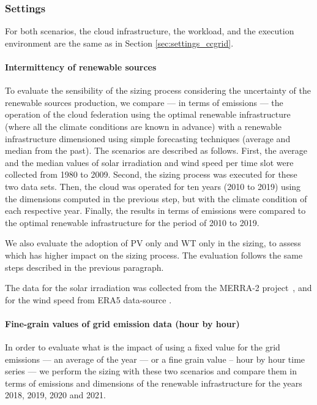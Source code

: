 \subsubsection{Settings}


For both scenarios, the cloud infrastructure, the workload, and the execution environment are the same as in Section  \ref{sec:settings_ccgrid}.

\paragraph{Intermittency of renewable sources}

To evaluate the sensibility of the sizing process considering the uncertainty of the renewable sources production, we compare --- in terms of  emissions ---  the operation of the cloud federation using the optimal renewable infrastructure (where all the climate conditions are known in advance) with a renewable infrastructure dimensioned using simple forecasting techniques (average and median from the past). The scenarios are described as follows. First, the average and the median values of solar irradiation and wind speed per time slot were collected from 1980 to 2009. Second, the sizing process was executed for these two data sets. Then, the cloud was operated for ten years (2010 to 2019) using the dimensions computed in the previous step, but with the climate condition of each respective year. Finally, the results in terms of  emissions were compared to the optimal renewable infrastructure for the period of 2010 to 2019.

We also evaluate the adoption of PV only and WT only in the sizing, to assess which has higher impact on the sizing process. The evaluation follows the same steps described in the previous paragraph.

The data for the solar irradiation was collected from the MERRA-2 project~\cite{GELARO2017MERRA2}, and for the wind speed from ERA5 data-source \cite{era5_wind_2022}.

\paragraph{Fine-grain values of grid emission data (hour by hour)}

In order to evaluate what is the impact of using a fixed value for the grid emissions --- an average of the year ---  or a fine grain value --  hour by hour time series ---  we perform the sizing with these two scenarios and compare them in terms of  emissions and dimensions of the renewable infrastructure for the years 2018, 2019, 2020 and 2021.


